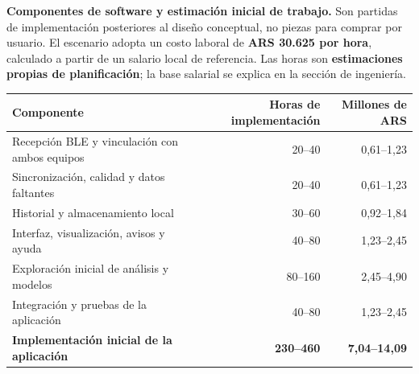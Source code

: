 \documentclass[11pt,a4paper]{article}
\begin{document}
\TPsalto
\begin{center}
\end{center}
\small
\textbf{Componentes de software y estimación inicial de trabajo.} Son partidas de implementación posteriores al diseño conceptual, no piezas para comprar por usuario. El escenario adopta un costo laboral de \textbf{ARS 30.625 por hora}, calculado a partir de un salario local de referencia. Las horas son \textbf{estimaciones propias de planificación}; la base salarial se explica en la sección de ingeniería.

\noindent\begin{tabularx}{\linewidth}{@{}>{\raggedright\arraybackslash}X r r@{}}
\toprule
\textbf{Componente} & \textbf{Horas de implementación} & \textbf{Millones de ARS}\\
\midrule
Recepción BLE y vinculación con ambos equipos & 20--40 & 0,61--1,23\\
Sincronización, calidad y datos faltantes & 20--40 & 0,61--1,23\\
Historial y almacenamiento local & 30--60 & 0,92--1,84\\
Interfaz, visualización, avisos y ayuda & 40--80 & 1,23--2,45\\
Exploración inicial de análisis y modelos & 80--160 & 2,45--4,90\\
Integración y pruebas de la aplicación & 40--80 & 1,23--2,45\\
\midrule
\textbf{Implementación inicial de la aplicación} & \textbf{230--460} & \textbf{7,04--14,09}\\
\bottomrule
\end{tabularx}
\end{document}
